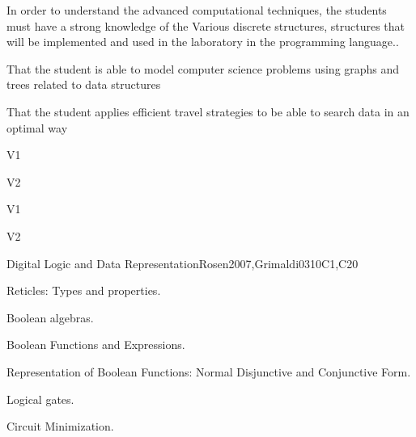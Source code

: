 \begin{syllabus}


\begin{justification}
In order to understand the advanced computational techniques, the students must have a strong knowledge of the
Various discrete structures, structures that will be implemented and used in the laboratory in the programming language..
\end{justification}

\begin{goals}
\item That the student is able to model computer science problems using graphs and trees related to data structures
\item That the student applies efficient travel strategies to be able to search data in an optimal way
\end{goals}

\begin{outcomes}{V1}
    \item {}
    \item {}	
    \item {}
\end{outcomes}

\begin{outcomes}{V2}
    \item {}
    \item {}	
    \item {}
\end{outcomes}

\begin{competences}{V1}
    \item {}
    \item {}
    \item {}
\end{competences}

\begin{competences}{V2}
    \item {}
    \item {}
    \item {}
\end{competences}

\begin{unit}{Digital Logic and Data Representation}{}{Rosen2007,Grimaldi03}{10}{C1,C20}
    \begin{topics}
     \item Reticles: Types and properties.
     \item Boolean algebras.
     \item Boolean Functions and Expressions.
     \item Representation of Boolean Functions: Normal Disjunctive and Conjunctive Form.
     \item Logical gates.
     \item Circuit Minimization.
    \end{topics}
 

\end{unit}
\end{syllabus}
